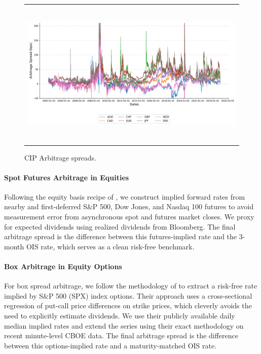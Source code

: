 \documentclass{article}
\begin{document}
\begin{figure}[h!]
  \centering
  \begin{tabular}{@{}c@{}}
    \includegraphics[width=.7\linewidth,height=200pt,width=400pt]{../docs_src/CIP_replicate.png}
  \end{tabular}
  \caption{CIP Arbitrage spreads.}
  \label{fig:cip_basis}
\end{figure}

\paragraph{Spot Futures Arbitrage in Equities}

Following the equity basis recipe of \citet{Hazelkorn2023}, we construct implied forward rates from nearby and first-deferred S\&P 500, Dow Jones, and Nasdaq 100 futures to avoid measurement error from asynchronous spot and futures market closes. We proxy for expected dividends using realized dividends from Bloomberg. The final arbitrage spread is the difference between this futures-implied rate and the 3-month OIS rate, which serves as a clean risk-free benchmark.

\paragraph{Box Arbitrage in Equity Options}
For box spread arbitrage, we follow the methodology of \citet{VanBinsbergen2022} to extract a risk-free rate implied by S\&P 500 (SPX) index options. Their approach uses a cross-sectional regression of put-call price differences on strike prices, which cleverly avoids the need to explicitly estimate dividends. We use their publicly available daily median implied rates and extend the series using their exact methodology on recent minute-level CBOE data. The final arbitrage spread is the difference between this options-implied rate and a maturity-matched OIS rate.
\end{document}
